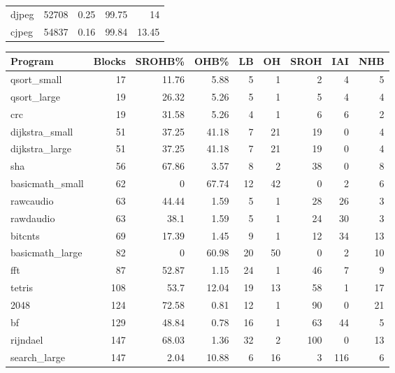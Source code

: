 \begin{tabular}{lrrrr}
 djpeg           &   52708 &   0.25 &        99.75 &   14    \\
 cjpeg           &   54837 &   0.16 &        99.84 &   13.45 \\
\hline
\end{tabular}\begin{tabular}{lrrrrrrrr}
\hline
 Program         &   Blocks &   SROHB\% &   OHB\% &   LB &   OH &   SROH &   IAI &   NHB \\
\hline
 qsort\_small     &       17 &    11.76 &   5.88 &    5 &    1 &      2 &     4 &     5 \\
 qsort\_large     &       19 &    26.32 &   5.26 &    5 &    1 &      5 &     4 &     4 \\
 crc             &       19 &    31.58 &   5.26 &    4 &    1 &      6 &     6 &     2 \\
 dijkstra\_small  &       51 &    37.25 &  41.18 &    7 &   21 &     19 &     0 &     4 \\
 dijkstra\_large  &       51 &    37.25 &  41.18 &    7 &   21 &     19 &     0 &     4 \\
 sha             &       56 &    67.86 &   3.57 &    8 &    2 &     38 &     0 &     8 \\
 basicmath\_small &       62 &     0    &  67.74 &   12 &   42 &      0 &     2 &     6 \\
 rawcaudio       &       63 &    44.44 &   1.59 &    5 &    1 &     28 &    26 &     3 \\
 rawdaudio       &       63 &    38.1  &   1.59 &    5 &    1 &     24 &    30 &     3 \\
 bitcnts         &       69 &    17.39 &   1.45 &    9 &    1 &     12 &    34 &    13 \\
 basicmath\_large &       82 &     0    &  60.98 &   20 &   50 &      0 &     2 &    10 \\
 fft             &       87 &    52.87 &   1.15 &   24 &    1 &     46 &     7 &     9 \\
 tetris          &      108 &    53.7  &  12.04 &   19 &   13 &     58 &     1 &    17 \\
 2048            &      124 &    72.58 &   0.81 &   12 &    1 &     90 &     0 &    21 \\
 bf              &      129 &    48.84 &   0.78 &   16 &    1 &     63 &    44 &     5 \\
 rijndael        &      147 &    68.03 &   1.36 &   32 &    2 &    100 &     0 &    13 \\
 search\_large    &      147 &     2.04 &  10.88 &    6 &   16 &      3 &   116 &     6 \\

\end{tabular}
